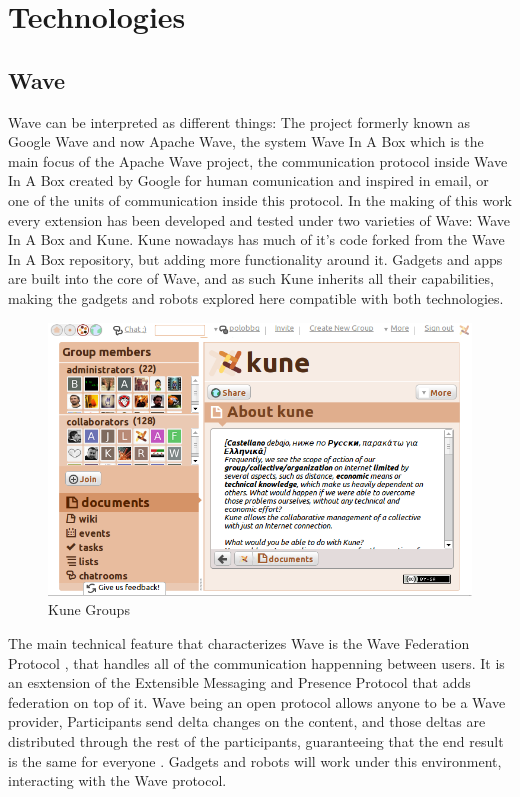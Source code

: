 \newpage
\section{Technologies}

\subsection{Wave}
Wave can be interpreted as different things: The project formerly known as Google Wave and now Apache Wave, the system Wave In A Box which is the main focus of the Apache Wave project, the communication protocol inside Wave In A Box created by Google for human comunication and inspired in email, or one of the units of communication inside this protocol. In the making of this work every extension has been developed and tested under two varieties of Wave: Wave In A Box and Kune. Kune nowadays has much of it's code forked from the Wave In A Box repository, but adding more functionality around it. Gadgets and apps are built into the core of Wave, and as such Kune inherits all their capabilities, making the gadgets and robots explored here compatible with both technologies.\\[.2cm]
\begin{figure}[h]
  \center
    \includegraphics[keepaspectratio, scale=0.4]{Media/Captures/Wave/Kune_Groups.png}
  \caption{Kune Groups}
  \label{fig:kune_groups}
\end{figure}
The main technical feature that characterizes Wave is the Wave Federation Protocol \cite{ref:wave_federated_protocol}, that handles all of the communication happenning between users. It is an esxtension of the Extensible Messaging and Presence Protocol \cite{ref:xmpp} that adds federation on top of it. Wave being an open protocol allows anyone to be a Wave provider, Participants send delta changes on the content, and those deltas are distributed through the rest of the participants, guaranteeing that the end result is the same for everyone \cite{ref:federating_websites_google_wave}. Gadgets and robots will work under this environment, interacting with the Wave protocol.

